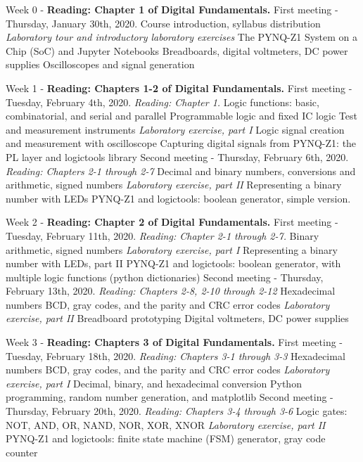 \documentclass[10pt]{article}
\begin{document}
\begin{outline}[enumerate]

\1 Week 0 - \textbf{Reading: Chapter 1 of Digital Fundamentals.}
\2 First meeting - Thursday, January 30th, 2020.
\3 Course introduction, syllabus distribution
\3 \textit{Laboratory tour and introductory laboratory exercises}
\4 The PYNQ-Z1 System on a Chip (SoC) and Jupyter Notebooks
\4 Breadboards, digital voltmeters, DC power supplies
\4 Oscilloscopes and signal generation

\1 Week 1 - \textbf{Reading: Chapters 1-2 of Digital Fundamentals.}
\2 First meeting - Tuesday, February 4th, 2020. \textit{Reading: Chapter 1.}
\3 Logic functions: basic, combinatorial, and serial and parallel
\3 Programmable logic and fixed IC logic
\3 Test and measurement instruments
\3 \textit{Laboratory exercise, part I}
\4 Logic signal creation and measurement with oscilloscope
\4 Capturing digital signals from PYNQ-Z1: the PL layer and logictools library
\2 Second meeting - Thursday, February 6th, 2020. \textit{Reading: Chapters 2-1 through 2-7}
\3 Decimal and binary numbers, conversions and arithmetic, signed numbers
\3 \textit{Laboratory exercise, part II}
\4 Representing a binary number with LEDs
\4 PYNQ-Z1 and logictools: boolean generator, simple version.

\1 Week 2 - \textbf{Reading: Chapter 2 of Digital Fundamentals.}
\2 First meeting - Tuesday, February 11th, 2020. \textit{Reading: Chapter 2-1 through 2-7.}
\3 Binary arithmetic, signed numbers
\3 \textit{Laboratory exercise, part I}
\4 Representing a binary number with LEDs, part II
\4 PYNQ-Z1 and logictools: boolean generator, with multiple logic functions (python dictionaries)
\2 Second meeting - Thursday, February 13th, 2020. \textit{Reading: Chapters 2-8, 2-10 through 2-12}
\3 Hexadecimal numbers
\3 BCD, gray codes, and the parity and CRC error codes
\3 \textit{Laboratory exercise, part II}
\4 Breadboard prototyping
\4 Digital voltmeters, DC power supplies

\1 Week 3 - \textbf{Reading: Chapters 3 of Digital Fundamentals.}
\2 First meeting - Tuesday, February 18th, 2020.  \textit{Reading: Chapters 3-1 through 3-3}
\3 Hexadecimal numbers
\3 BCD, gray codes, and the parity and CRC error codes
\3 \textit{Laboratory exercise, part I}
\4 Decimal, binary, and hexadecimal conversion
\4 Python programming, random number generation, and matplotlib
\2 Second meeting - Thursday, February 20th, 2020. \textit{Reading: Chapters 3-4 through 3-6}
\3 Logic gates: NOT, AND, OR, NAND, NOR, XOR, XNOR
\3 \textit{Laboratory exercise, part II}
\4 PYNQ-Z1 and logictools: finite state machine (FSM) generator, gray code counter


\end{outline}
\end{document}
